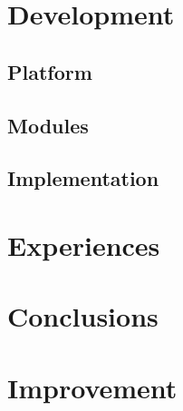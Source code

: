\documentclass[paper=a4, fontsize=11pt]{scrartcl} %
\numberwithin{equation}{section} %
\numberwithin{figure}{section} %
\numberwithin{table}{section} %
\begin{document}
\section{Development}

\subsection{Platform}

\subsection{Modules}

\subsection{Implementation}

\section{Experiences}

\section{Conclusions}

\section{Improvement}
\end{document}
